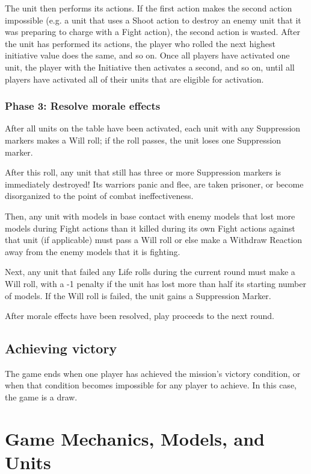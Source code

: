 \begin{multicols}{2}
The unit then performs its actions. If the first action makes the second action impossible (e.g. a unit that uses a Shoot action to destroy an enemy unit that it was preparing to charge with a Fight action), the second action is wasted.
After the unit has performed its actions, the player who rolled the next highest initiative value does the same, and so on. Once all players have activated one unit, the player with the Initiative then activates a second, and so on, until all players have activated all of their units that are eligible for activation.


\subsection*{Phase 3: Resolve morale effects}

After all units on the table have been activated, each unit with any Suppression markers makes a Will roll; if the roll passes, the unit loses one Suppression marker.

After this roll, any unit that still has three or more Suppression markers is immediately destroyed! Its warriors panic and flee, are taken prisoner, or become disorganized to the point of combat ineffectiveness.

Then, any unit with models in base contact with enemy models that lost more models during Fight actions than it killed during its own Fight actions against that unit (if applicable) must pass a Will roll or else make a Withdraw Reaction away from the enemy models that it is fighting.

Next, any unit that failed any Life rolls during the current round must make a Will roll, with a -1 penalty if the unit has lost more than half its starting number of models. If the Will roll is failed, the unit gains a Suppression Marker.

After morale effects have been resolved, play proceeds to the next round.

\section*{Achieving victory}

The game ends when one player has achieved the mission's victory condition, or when that condition becomes impossible for any player to achieve. In this case, the game is a draw.




\chapter*{Game Mechanics, Models, and Units}


\end{multicols}
